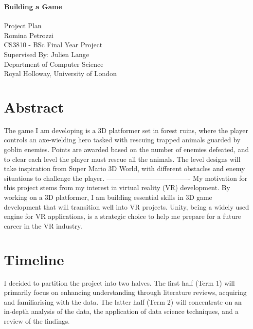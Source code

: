 \documentclass[12pt]{article}
\begin{document}
\begin{titlepage}
    \centering
    \vspace*{5cm}
    \LARGE\textbf{Building a Game}\\
    \vspace{1cm}
    \hrulefill\\[0.5cm] %
    \large Project Plan\\
    \vspace{0.5cm}
    \large Romina Petrozzi\\
    \vspace{0.5cm}
    \large CS3810 - BSc Final Year Project\\
    \vspace{2cm}
    \large Supervised By: Julien Lange\\
    \vspace{0.5cm}
    \large Department of Computer Science\\
    \large Royal Holloway, University of London\\
    \vfill
\end{titlepage}



\section*{\centering Abstract}
The game I am developing is a 3D platformer set in forest ruins, where the player controls an axe-wielding hero tasked with rescuing trapped animals guarded by goblin enemies. Points are awarded based on the number of enemies defeated, and to clear each level the player must rescue all the animals. The level designs will take inspiration from Super Mario 3D World, with different obstacles and enemy situations to challenge the player. ------------------------------------- My motivation for this project stems from my interest in virtual reality (VR) development. By working on a 3D platformer, I am building essential skills in 3D game development that will transition well into VR projects. Unity, being a widely used engine for VR applications, is a strategic choice to help me prepare for a future career in the VR industry.



\section{Timeline}
I decided to partition the project into two halves. The first half (Term 1) will primarily focus on enhancing understanding through literature reviews, acquiring and familiarising with the data. The latter half (Term 2) will concentrate on an in-depth analysis of the data, the application of data science techniques, and a review of the findings.
\end{document}
